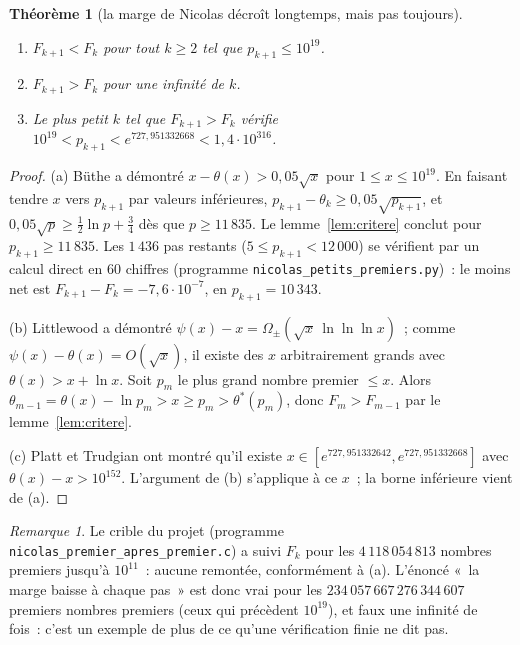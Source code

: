 \documentclass[11pt,a4paper]{article}
\newtheorem{theoreme}{Théorème}
\theoremstyle{definition}
\theoremstyle{remark}
\newtheorem*{remarque}{Remarque}
\begin{document}
\begin{theoreme}[la marge de Nicolas décroît longtemps, mais pas toujours]\label{th:nicolas}
\leavevmode
\begin{enumerate}
\item[(a)] $F_{k+1}<F_k$ pour tout $k\ge2$ tel que $p_{k+1}\le10^{19}$.
\item[(b)] $F_{k+1}>F_k$ pour une infinité de $k$.
\item[(c)] Le plus petit $k$ tel que $F_{k+1}>F_k$ vérifie $10^{19}<p_{k+1}<e^{727{,}951332668}<1{,}4\cdot10^{316}$.
\end{enumerate}
\end{theoreme}
\begin{proof}
(a) Büthe \cite[th.~2]{buthe} a démontré $x-\theta(x)>0{,}05\sqrt x$ pour $1\le x\le10^{19}$. En faisant tendre $x$ vers $p_{k+1}$ par
valeurs inférieures, $p_{k+1}-\theta_k\ge0{,}05\sqrt{p_{k+1}}$, et $0{,}05\sqrt p\ge\frac12\ln p+\frac34$ dès que $p\ge11\,835$. Le
lemme~\ref{lem:critere} conclut pour $p_{k+1}\ge11\,835$. Les $1\,436$ pas restants ($5\le p_{k+1}<12\,000$) se vérifient par un calcul
direct en $60$ chiffres (programme \texttt{nicolas\_petits\_premiers.py})~: le moins net est $F_{k+1}-F_k=-7{,}6\cdot10^{-7}$, en $p_{k+1}=10\,343$.

(b) Littlewood \cite{littlewood} a démontré $\psi(x)-x=\Omega_\pm(\sqrt x\,\ln\ln\ln x)$~; comme $\psi(x)-\theta(x)=O(\sqrt x)$, il
existe des $x$ arbitrairement grands avec $\theta(x)>x+\ln x$. Soit $p_m$ le plus grand nombre premier $\le x$. Alors
$\theta_{m-1}=\theta(x)-\ln p_m>x\ge p_m>\theta^*(p_m)$, donc $F_m>F_{m-1}$ par le lemme~\ref{lem:critere}.

(c) Platt et Trudgian \cite{platttrudgian} ont montré qu'il existe $x\in[e^{727{,}951332642},e^{727{,}951332668}]$ avec
$\theta(x)-x>10^{152}$. L'argument de (b) s'applique à ce $x$~; la borne inférieure vient de (a).
\end{proof}

\begin{remarque}
Le crible du projet (programme \texttt{nicolas\_premier\_apres\_premier.c}) a suivi $F_k$ pour les $4\,118\,054\,813$ nombres premiers
jusqu'à $10^{11}$~: aucune remontée, conformément à (a). L'énoncé «~la marge baisse à chaque pas~» est donc vrai pour les
$234\,057\,667\,276\,344\,607$ premiers nombres premiers (ceux qui précèdent $10^{19}$), et faux une infinité de fois~: c'est un
exemple de plus de ce qu'une vérification finie ne dit pas.
\end{remarque}
\end{document}
